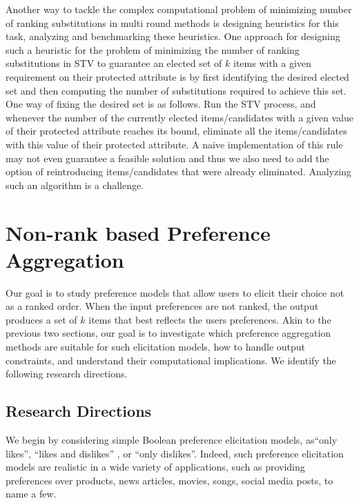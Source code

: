 \documentclass[11pt]{article}
\begin{document}
\smallskip {} 
Another way to tackle the complex computational problem of minimizing number of ranking substitutions in multi round methods is designing heuristics for this task, analyzing and benchmarking these heuristics. One approach for designing such a heuristic for the problem of minimizing the number of ranking substitutions in STV to guarantee an elected set of $k$ items with a given requirement on their protected attribute is by first identifying the desired elected set and then computing the number of substitutions required to achieve this set. One way of fixing the desired set is as follows. Run the STV process, and whenever the number of the currently elected items/candidates with a given value of their protected attribute reaches its bound, eliminate all the items/candidates with this value of their protected attribute. A naive implementation of this rule may not even guarantee a feasible solution and thus we also need to add the option of reintroducing items/candidates that were already eliminated. Analyzing such an algorithm is a challenge.



%
\vspace{-0.1in}
\section{Non-rank based Preference Aggregation}\label{nonrank}
\vspace{-0.1in}
Our goal is to study preference  models that allow users to elicit their choice not as a ranked order. When the input preferences are not ranked, the output produces a set of $k$ items that best reflects the users preferences. Akin to the previous two sections, our goal is to investigate which preference aggregation methods are suitable for such elicitation models, how to handle output constraints, and understand their computational implications. We identify the following research directions.
\vspace{-0.1in}
\subsection{Research Directions}
\vspace{-0.1in}
We begin by considering simple Boolean preference elicitation models, as``only likes'', ``likes and dislikes'' , or ``only dislikes''. Indeed, such preference elicitation models are realistic in a wide variety of applications, such as providing preferences over products, news articles, movies, songs, social media posts, to name a few.
\end{document}
